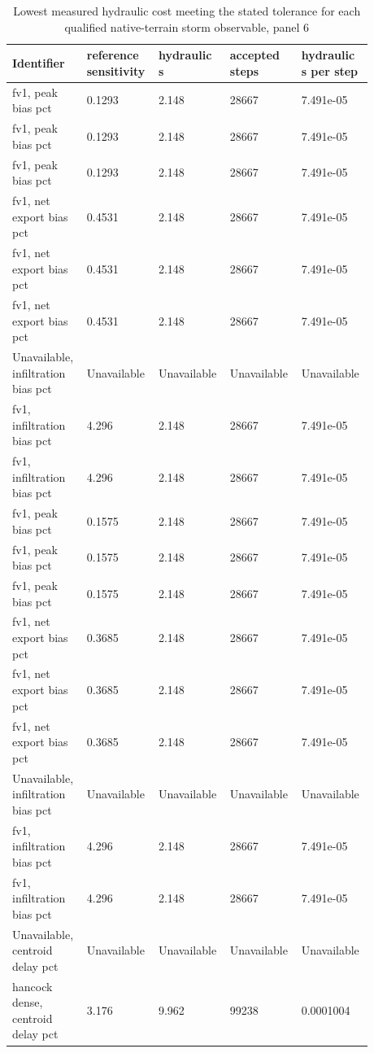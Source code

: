 \begin{longtable}{p{0.1760\linewidth}p{0.1760\linewidth}p{0.1760\linewidth}p{0.1760\linewidth}p{0.1760\linewidth}}
\caption{Lowest measured hydraulic cost meeting the stated tolerance for each qualified native-terrain storm observable, panel 6}\\
\hline
Identifier & reference sensitivity & hydraulic s & accepted steps & hydraulic s per step \\
\hline\endhead
fv1, peak bias pct & 0.1293 & 2.148 & 28667 & 7.491e-05 \\
fv1, peak bias pct & 0.1293 & 2.148 & 28667 & 7.491e-05 \\
fv1, peak bias pct & 0.1293 & 2.148 & 28667 & 7.491e-05 \\
fv1, net export bias pct & 0.4531 & 2.148 & 28667 & 7.491e-05 \\
fv1, net export bias pct & 0.4531 & 2.148 & 28667 & 7.491e-05 \\
fv1, net export bias pct & 0.4531 & 2.148 & 28667 & 7.491e-05 \\
Unavailable, infiltration bias pct & Unavailable & Unavailable & Unavailable & Unavailable \\
fv1, infiltration bias pct & 4.296 & 2.148 & 28667 & 7.491e-05 \\
fv1, infiltration bias pct & 4.296 & 2.148 & 28667 & 7.491e-05 \\
fv1, peak bias pct & 0.1575 & 2.148 & 28667 & 7.491e-05 \\
fv1, peak bias pct & 0.1575 & 2.148 & 28667 & 7.491e-05 \\
fv1, peak bias pct & 0.1575 & 2.148 & 28667 & 7.491e-05 \\
fv1, net export bias pct & 0.3685 & 2.148 & 28667 & 7.491e-05 \\
fv1, net export bias pct & 0.3685 & 2.148 & 28667 & 7.491e-05 \\
fv1, net export bias pct & 0.3685 & 2.148 & 28667 & 7.491e-05 \\
Unavailable, infiltration bias pct & Unavailable & Unavailable & Unavailable & Unavailable \\
fv1, infiltration bias pct & 4.296 & 2.148 & 28667 & 7.491e-05 \\
fv1, infiltration bias pct & 4.296 & 2.148 & 28667 & 7.491e-05 \\
Unavailable, centroid delay pct & Unavailable & Unavailable & Unavailable & Unavailable \\
hancock dense, centroid delay pct & 3.176 & 9.962 & 99238 & 0.0001004 \\

\end{longtable}
